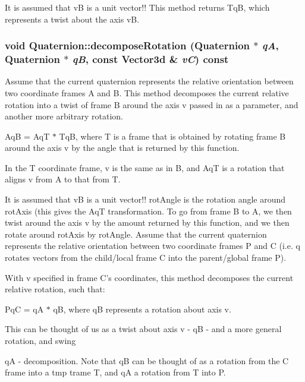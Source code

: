 It is assumed that vB is a unit vector!! This method returns TqB, which represents a twist about the axis vB. \hypertarget{classCartWheel_1_1Math_1_1Quaternion_ab5b687af1e88a900759cf931fa9dae8c}{
\subsubsection[{decomposeRotation}]{\setlength{\rightskip}{0pt plus 5cm}void Quaternion::decomposeRotation ({\bf Quaternion} $\ast$ {\em qA}, \/  {\bf Quaternion} $\ast$ {\em qB}, \/  const {\bf Vector3d} \& {\em vC}) const}}
\label{classCartWheel_1_1Math_1_1Quaternion_ab5b687af1e88a900759cf931fa9dae8c}
Assume that the current quaternion represents the relative orientation between two coordinate frames A and B. This method decomposes the current relative rotation into a twist of frame B around the axis v passed in as a parameter, and another more arbitrary rotation.

AqB = AqT $\ast$ TqB, where T is a frame that is obtained by rotating frame B around the axis v by the angle that is returned by this function.

In the T coordinate frame, v is the same as in B, and AqT is a rotation that aligns v from A to that from T.

It is assumed that vB is a unit vector!! rotAngle is the rotation angle around rotAxis (this gives the AqT transformation. To go from frame B to A, we then twist around the axis v by the amount returned by this function, and we then rotate around rotAxis by rotAngle. Assume that the current quaternion represents the relative orientation between two coordinate frames P and C (i.e. q rotates vectors from the child/local frame C into the parent/global frame P).

With v specified in frame C's coordinates, this method decomposes the current relative rotation, such that:

PqC = qA $\ast$ qB, where qB represents a rotation about axis v.

This can be thought of us as a twist about axis v -\/ qB -\/ and a more general rotation, and swing
\begin{DoxyItemize}
\item qA -\/ decomposition. Note that qB can be thought of as a rotation from the C frame into a tmp trame T, and qA a rotation from T into P.
\end{DoxyItemize}

